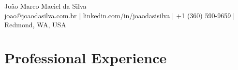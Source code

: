 \documentclass[letterpaper,11pt]{article}
\begin{document}
\begin{center}
{\Large João Marco Maciel da Silva}\\[5pt]
{\footnotesize joao@joaodasilva.com.br | linkedin.com/in/joaodasisilva | +1 (360) 590-9659 | Redmond, WA, USA}\\[5pt]
\end{center}


\section{Professional Experience}



\titlespacing{\section}{0pt}{4pt}{2.81pt}







\end{document}
